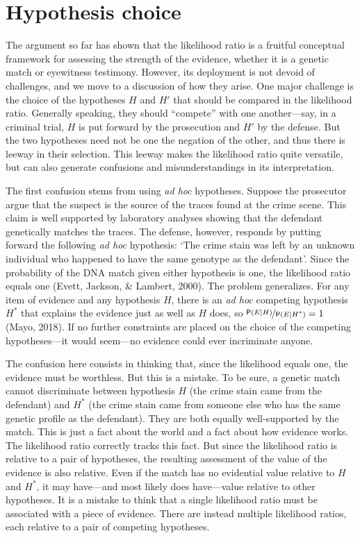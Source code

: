 \documentclass[
  10pt,
  dvipsnames,enabledeprecatedfontcommands]{scrartcl}
\newcommand{\pr}[1]{\mathsf{P}(#1)}
\begin{document}
\hypertarget{hypothesis-choice}{%
\section{\texorpdfstring{Hypothesis choice
\label{sec:hchoice}}{Hypothesis choice }}\label{hypothesis-choice}}

The argument so far has shown that the likelihood ratio is a fruitful
conceptual framework for assessing the strength of the evidence, whether
it is a genetic match or eyewitness testimony. However, its deployment
is not devoid of challenges, and we move to a discussion of how they
arise. One major challenge is the choice of the hypotheses \(H\) and
\(H'\) that should be compared in the likelihood ratio. Generally
speaking, they should ``compete'' with one another---say, in a criminal
trial, \(H\) is put forward by the prosecution and \(H'\) by the
defense. But the two hypotheses need not be one the negation of the
other, and thus there is leeway in their selection. This leeway makes
the likelihood ratio quite versatile, but can also generate confusions
and misunderstandings in its interpretation.

The first confusion stems from using \textit{ad hoc} hypotheses. Suppose
the prosecutor argue that the suspect is the source of the traces found
at the crime scene. This claim is well supported by laboratory analyses
showing that the defendant genetically matches the traces. The defense,
however, responds by putting forward the following \textit{ad hoc}
hypothesis: `The crime stain was left by an unknown individual who
happened to have the same genotype as the defendant'. Since the
probability of the DNA match given either hypothesis is one, the
likelihood ratio equals one (Evett, Jackson, \& Lambert, 2000). The
problem generalizes. For any item of evidence and any hypothesis \(H\),
there is an \textit{ad hoc} competing hypothesis \(H^*\) that explains
the evidence just as well as \(H\) does, so
\(\nicefrac{\pr{E \vert H}}{\pr{E \vert H^*}}=1\) (Mayo, 2018). If no
further constraints are placed on the choice of the competing
hypotheses---it would seem---no evidence could ever incriminate anyone.

The confusion here consists in thinking that, since the likelihood
equals one, the evidence must be worthless. But this is a mistake. To be
sure, a genetic match cannot discriminate between hypothesis \(H\) (the
crime stain came from the defendant) and \(H^*\) (the crime stain came
from someone else who has the same genetic profile as the defendant).
They are both equally well-supported by the match. This is just a fact
about the world and a fact about how evidence works. The likelihood
ratio correctly tracks this fact. But since the likelihood ratio is
relative to a pair of hypotheses, the resulting assessment of the value
of the evidence is also relative. Even if the match has no evidential
value relative to \(H\) and \(H^*\), it may have---and most likely does
have---value relative to other hypotheses. It is a mistake to think that
a single likelihood ratio must be associated with a piece of evidence.
There are instead multiple likelihood ratios, each relative to a pair of
competing hypotheses.
\end{document}
